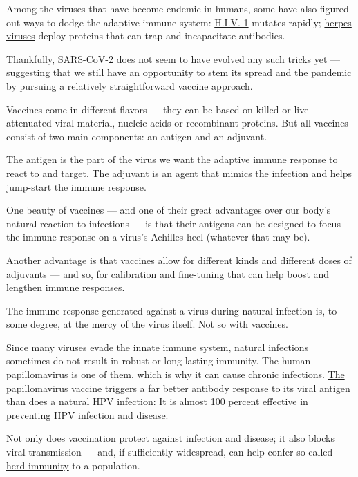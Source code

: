 Among the viruses that have become endemic in humans, some have also
figured out ways to dodge the adaptive immune system:
\href{https://www.ncbi.nlm.nih.gov/pmc/articles/PMC2877745/}{H.I.V.-1}
mutates rapidly; \href{https://jvi.asm.org/content/76/18/9232}{herpes
viruses} deploy proteins that can trap and incapacitate antibodies.

Thankfully, SARS-CoV-2 does not seem to have evolved any such tricks yet
--- suggesting that we still have an opportunity to stem its spread and
the pandemic by pursuing a relatively straightforward vaccine approach.

Vaccines come in different flavors --- they can be based on killed or
live attenuated viral material, nucleic acids or recombinant proteins.
But all vaccines consist of two main components: an antigen and an
adjuvant.

The antigen is the part of the virus we want the adaptive immune
response to react to and target. The adjuvant is an agent that mimics
the infection and helps jump-start the immune response.

One beauty of vaccines --- and one of their great advantages over our
body's natural reaction to infections --- is that their antigens can be
designed to focus the immune response on a virus's Achilles heel
(whatever that may be).

Another advantage is that vaccines allow for different kinds and
different doses of adjuvants --- and so, for calibration and fine-tuning
that can help boost and lengthen immune responses.

The immune response generated against a virus during natural infection
is, to some degree, at the mercy of the virus itself. Not so with
vaccines.

Since many viruses evade the innate immune system, natural infections
sometimes do not result in robust or long-lasting immunity. The human
papillomavirus is one of them, which is why it can cause chronic
infections.
\href{https://www.sciencedirect.com/science/article/pii/S0090825817307746\#f0005}{The
papillomavirus vaccine} triggers a far better antibody response to its
viral antigen than does a natural HPV infection: It is
\href{https://www.cdc.gov/vaccines/vpd/hpv/hcp/vaccines.html}{almost 100
percent effective} in preventing HPV infection and disease.

Not only does vaccination protect against infection and disease; it also
blocks viral transmission --- and, if sufficiently widespread, can help
confer so-called
\href{https://academic.oup.com/cid/article/52/7/911/299077}{herd
immunity} to a population.

